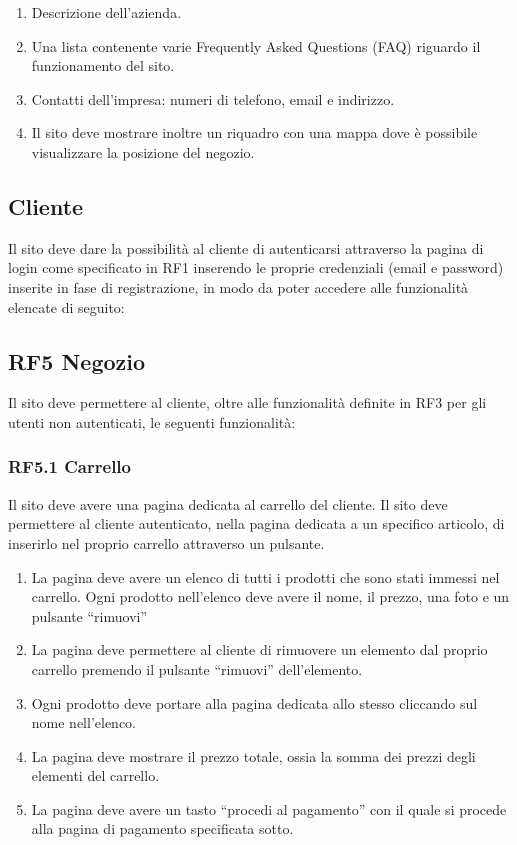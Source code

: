 \documentclass{report}
\begin{document}
\begin{enumerate}
	\item Descrizione dell'azienda.
	\item Una lista contenente varie Frequently Asked Questions (FAQ) riguardo il funzionamento del sito.
	\item Contatti dell’impresa: numeri di telefono, email e indirizzo.
	\item Il sito deve mostrare inoltre un riquadro con una mappa dove è possibile visualizzare la posizione del negozio.
\end{enumerate}


\subsection{Cliente}
Il sito deve dare la possibilità al cliente di autenticarsi attraverso la pagina di login come specificato in RF1 inserendo le proprie credenziali (email e password) inserite in fase di registrazione, in modo da poter accedere alle funzionalità elencate di seguito:

\subsection*{RF5 Negozio}
Il sito deve permettere al cliente, oltre alle funzionalità definite in RF3 per gli utenti non autenticati, le seguenti funzionalità:

\subsubsection{RF5.1 Carrello}
Il sito deve avere una pagina dedicata al carrello del cliente.
Il sito deve permettere al cliente autenticato, nella pagina dedicata a un specifico articolo, di inserirlo nel proprio carrello attraverso un pulsante.

\begin{enumerate}
	\item La pagina deve avere un elenco di tutti i prodotti che sono stati immessi nel carrello. Ogni prodotto nell’elenco deve  avere il nome, il prezzo, una foto e  un pulsante “rimuovi”
	
	\item La pagina deve permettere al cliente di rimuovere un elemento dal proprio carrello premendo il pulsante “rimuovi” dell’elemento.

	\item Ogni prodotto deve portare alla pagina dedicata allo stesso cliccando sul nome nell’elenco.
	
	\item La pagina deve mostrare il prezzo totale, ossia la somma dei prezzi degli elementi del carrello.

	\item La pagina deve avere un tasto “procedi al pagamento” con il quale si procede alla pagina di pagamento specificata sotto.

\end{enumerate}
\end{document}

